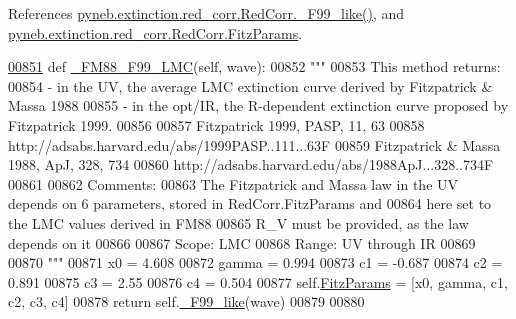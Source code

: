 \begin{DoxyVerb}
References \hyperlink{red__corr_8py_source_l00658}{pyneb.\+extinction.\+red\+\_\+corr.\+Red\+Corr.\+\_\+\+F99\+\_\+like()}, and \hyperlink{red__corr_8py_source_l00078}{pyneb.\+extinction.\+red\+\_\+corr.\+Red\+Corr.\+Fitz\+Params}.


\begin{DoxyCode}
\hypertarget{classpyneb_1_1extinction_1_1red__corr_1_1_red_corr_l00851}{}\hyperlink{classpyneb_1_1extinction_1_1red__corr_1_1_red_corr_aa175c2a1489246b81d7c3b81fb88d7d9}{00851}     \textcolor{keyword}{def }\hyperlink{classpyneb_1_1extinction_1_1red__corr_1_1_red_corr_aa175c2a1489246b81d7c3b81fb88d7d9}{\_FM88\_F99\_LMC}(self, wave):
00852         \textcolor{stringliteral}{"""}
00853 \textcolor{stringliteral}{        This method returns:}
00854 \textcolor{stringliteral}{        - in the UV, the average LMC extinction curve derived by Fitzpatrick & Massa 1988}
00855 \textcolor{stringliteral}{        - in the opt/IR, the R-dependent extinction curve proposed by Fitzpatrick 1999.}
00856 \textcolor{stringliteral}{        }
00857 \textcolor{stringliteral}{        Fitzpatrick 1999, PASP, 11, 63}
00858 \textcolor{stringliteral}{        http://adsabs.harvard.edu/abs/1999PASP..111...63F}
00859 \textcolor{stringliteral}{        Fitzpatrick & Massa 1988, ApJ, 328, 734}
00860 \textcolor{stringliteral}{        http://adsabs.harvard.edu/abs/1988ApJ...328..734F}
00861 \textcolor{stringliteral}{        }
00862 \textcolor{stringliteral}{        Comments:}
00863 \textcolor{stringliteral}{        The Fitzpatrick and Massa law in the UV depends on 6 parameters, stored in RedCorr.FitzParams and }
00864 \textcolor{stringliteral}{        here set to the LMC values derived in FM88}
00865 \textcolor{stringliteral}{        R\_V must be provided, as the law depends on it}
00866 \textcolor{stringliteral}{        }
00867 \textcolor{stringliteral}{        Scope: LMC}
00868 \textcolor{stringliteral}{        Range: UV through IR}
00869 \textcolor{stringliteral}{}
00870 \textcolor{stringliteral}{        """}
00871         x0 = 4.608
00872         gamma = 0.994
00873         c1 = -0.687
00874         c2 = 0.891
00875         c3 = 2.55
00876         c4 = 0.504  
00877         self.\hyperlink{classpyneb_1_1extinction_1_1red__corr_1_1_red_corr_a133fcc7513d358e629266b24cbe7bebc}{FitzParams} = [x0, gamma, c1, c2, c3, c4]
00878         \textcolor{keywordflow}{return} self.\hyperlink{classpyneb_1_1extinction_1_1red__corr_1_1_red_corr_afa769aa42ed7d39fb04fd36fda88b54e}{\_F99\_like}(wave)
00879     
00880     
\end{DoxyCode}
\hypertarget{classpyneb_1_1extinction_1_1red__corr_1_1_red_corr_acc965477d452c5914a8af1d8d6116a23}{}

\end{DoxyVerb}
